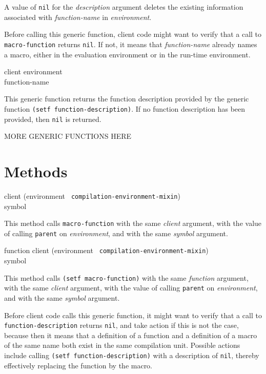 A value of \texttt{nil} for the \textit{description} argument deletes
the existing information associated with \textit{function-name} in
\textit{environment}.

Before calling this generic function, client code might want to verify
that a call to \texttt{macro-function} returns \texttt{nil}.  If not,
it means that \textit{function-name} already names a macro, either in
the evaluation environment or in the run-time environment.

 {client environment \\ function-name}

This generic function returns the function description provided by the
generic function \texttt{(setf function-description)}.  If no function
description has been provided, then \texttt{nil} is returned.

MORE GENERIC FUNCTIONS HERE

\section{Methods}

{\small{} {client (environment {\tt
      compilation-environment-mixin}) \\ symbol}
}

This method calls \texttt{macro-function} with the same
\textit{client} argument, with the value of calling \texttt{parent} on
\textit{environment}, and with the same \textit{symbol} argument.

{\small{} {function client (environment {\tt
      compilation-environment-mixin}) \\ symbol}
}

This method calls \texttt{(setf macro-function)} with the same
\textit{function} argument, with the same \textit{client} argument, with
the value of calling \texttt{parent} on \textit{environment}, and with
the same \textit{symbol} argument.

Before client code calls this generic function, it might want to
verify that a call to \texttt{function-description} returns
\texttt{nil}, and take action if this is not the case, because then it
means that a definition of a function and a definition of a macro of
the same name both exist in the same compilation unit.  Possible
actions include calling \texttt{(setf function-description)} with a
description of \texttt{nil}, thereby effectively replacing the
function by the macro.
